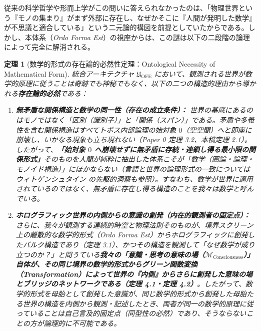 \documentclass[11pt,a4paper]{ltjsarticle}
\theoremstyle{definition}
\theoremstyle{plain}
\newtheorem{theorem}{定理}[section]
\begin{document}
従来の科学哲学や形而上学がこの問いに答えられなかったのは、「物理世界という『モノの集まり』がまず外部に存在し、なぜかそこに『人間が発明した数学』が不思議と適合している」という二元論的構図を前提としていたからである。しかし、本体系（\textit{Ordo Forma Est}）の視座からは、この謎は以下の二段階の論理によって完全に解消される。

\begin{theorem}[数学的形式の存在論的必然性定理：Ontological Necessity of Mathematical Form]
統合アーキテクチャ $\mathfrak{U}_{\mathrm{OFE}}$ において、観測される世界が数学的原理に従うことは奇跡でも神秘でもなく、以下の二つの構造的理由から導かれる\textbf{存在論的必然}である：
\begin{enumerate}
    \item \textbf{無矛盾な関係構造と数学の同一性（存在の成立条件）：}
    世界の基底にあるのはモノではなく「区別（識別子）」と「関係（スパン）」である。矛盾や多義性を含む関係構造はすべてトポス内部論理の始対象 $0$（空空間）へと即座に崩壊し、いかなる現象も立ち現れない（Paper 0 \cite{Ota2026_0} 定理 3.2、本稿定理 2.1）。したがって、\textbf{「始対象 $0$ へ崩壊せずに無矛盾に存続・連鎖し得る最小限の関係形式」}そのものを人間が純粋に抽出した体系こそが「数学（圏論・論理・モノイド構造）」にほかならない（言語と世界の論理形式の一致についてはウィトゲンシュタイン \cite{Wittgenstein1921} の先駆的洞察も参照）。すなわち、数学が世界に適用されているのではなく、無矛盾に存在し得る構造のことを我々は数学と呼んでいる。
    \item \textbf{ホログラフィック世界の内側からの意識の創発（内在的観測者の固定点）：}
    さらに、我々が観測する連続的時空と物理法則そのものが、境界スクリーン上の離散的な数学的形式（\textit{Ordo Forma Est}）からホログラフィックに創発したバルク構造であり（定理 3.1）、かつその構造を観測して「なぜ数学が成り立つのか？」と問うている\textbf{我々の「意識・思考の意味の場（$\mathcal{M}_{\mathrm{Consciousness}}$）」自体が、その同じ境界の数学的形式からグリーン関数変換（Transformation）によって世界の『内側』からさらに創発した意味の場とブリッジのネットワークである（定理 4.1・定理 4.2）}。したがって、数学的形式を母胎として創発した意識が、同じ数学的形式から創発した母胎たる世界の構造を内側から観測・記述したとき、両者が同一の数学的原理に従っていることは自己言及的固定点（同型性の必然）であり、そうならないことの方が論理的に不可能である。
\end{enumerate}
\end{theorem}
\end{document}
